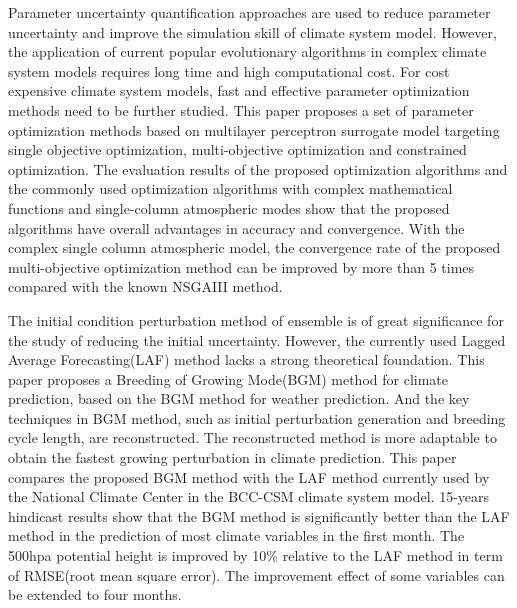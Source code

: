 
\begin{eabstract}
Parameter uncertainty quantification approaches are used to reduce parameter uncertainty and improve the simulation skill of climate system model. However, the application of current popular evolutionary algorithms in complex climate system models requires long time and high computational cost. For cost expensive climate system models, fast and effective parameter optimization methods need to be further studied. This paper proposes a set of parameter optimization methods based on multilayer perceptron surrogate model targeting single objective optimization, multi-objective optimization and constrained optimization. The evaluation results of the proposed optimization algorithms and the commonly used optimization algorithms with complex mathematical functions and single-column atmospheric modes show that the proposed algorithms have overall advantages in accuracy and convergence. With the complex single column atmospheric model, the convergence rate of the proposed multi-objective optimization method can be improved by more than 5 times compared with the known NSGAIII method.

The initial condition perturbation method of ensemble is of great significance for the study of reducing the initial uncertainty. However, the currently used Lagged Average Forecasting(LAF) method lacks a strong theoretical foundation. This paper proposes a Breeding of Growing Mode(BGM) method for climate prediction, based on the BGM method for weather prediction. And the key techniques in BGM method, such as initial perturbation generation and breeding cycle length, are reconstructed. The reconstructed method is more adaptable to obtain the fastest growing perturbation in climate prediction. This paper compares the proposed BGM method with the LAF method currently used by the National Climate Center in the BCC-CSM climate system model. 15-years hindicast results show that the BGM method is significantly better than the LAF method in the prediction of most climate variables in the first month. The 500hpa potential height is improved by 10\% relative to the LAF method in term of RMSE(root mean square error). The improvement effect of some variables can be extended to four months.


\end{eabstract}
